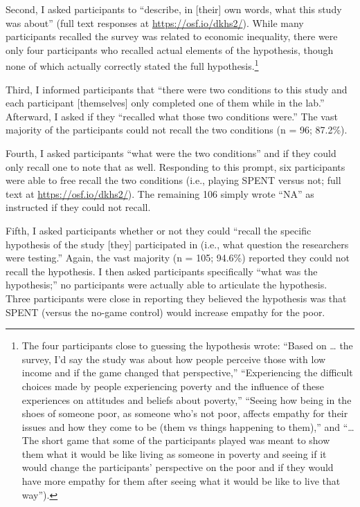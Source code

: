 \documentclass{sfuthesis}
\begin{document}
Second, I asked participants to “describe, in [their] own words, what this study was about” (full text responses at \href{https://osf.io/dkhs2/}{https://osf.io/dkhs2/}). While many participants recalled the survey was related to economic inequality, there were only four participants who recalled actual elements of the hypothesis, though none of which actually correctly stated the full hypothesis.\footnote{The four participants close to guessing the hypothesis wrote: “Based on … the survey, I'd say the study was about how people perceive those with low income and if the game changed that perspective,” “Experiencing the difficult choices made by people experiencing poverty and the influence of these experiences on attitudes and beliefs about poverty,” “Seeing how being in the shoes of someone poor, as someone who’s not poor, affects empathy for their issues and how they come to be (them vs things happening to them),” and “… The short game that some of the participants played was meant to show them what it would be like living as someone in poverty and seeing if it would change the participants' perspective on the poor and if they would have more empathy for them after seeing what it would be like to live that way”).}

Third, I informed participants that “there were two conditions to this study and each participant [themselves] only completed one of them while in the lab.” Afterward, I asked if they “recalled what those two conditions were.” The vast majority of the participants could not recall the two conditions (n = 96; 87.2\%).

Fourth, I asked participants “what were the two conditions” and if they could only recall one to note that as well. Responding to this prompt, six participants were able to free recall the two conditions (i.e., playing SPENT versus not; full text at \href{https://osf.io/dkhs2/}{https://osf.io/dkhs2/}). The remaining 106 simply wrote “NA” as instructed if they could not recall.

Fifth, I asked participants whether or not they could “recall the specific hypothesis of the study [they] participated in (i.e., what question the researchers were testing.” Again, the vast majority (n = 105; 94.6\%) reported they could not recall the hypothesis. I then asked participants specifically “what was the hypothesis;” no participants were actually able to articulate the hypothesis. Three participants were close in reporting they believed the hypothesis was that SPENT (versus the no-game control) would increase empathy for the poor.
\end{document}
